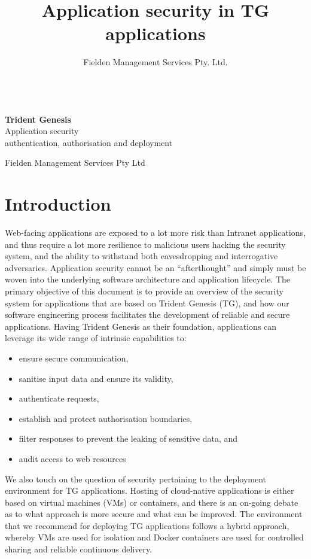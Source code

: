 \documentclass[a4paper,12pt,oneside,openright]{memoir}
\title{Application security in TG applications}
\author{Fielden Management Services Pty. Ltd.}
\date{}
\newcommand*{\titleTH}{\begingroup%
\raggedleft
\vspace*{\baselineskip}
{\Large ~}\\[0.167\textheight]
{\bfseries Trident Genesis}\\[\baselineskip]
{\textcolor{basiccolor}{\Huge Application security}}\\[\baselineskip]
{\small authentication, authorisation and deployment}\par
\vfill
{\Large Fielden Management Services Pty Ltd}\par
\endgroup}
\begin{document}
\titleTH
\thispagestyle{empty}
\clearpage
{}


\onehalfspacing

\section*{Introduction}\label{sec:00}
	Web-facing applications are exposed to a lot more risk than Intranet applications, and thus require a lot more resilience to malicious users hacking the security system, and the ability to withstand both eavesdropping and interrogative adversaries.
	Application security cannot be an ``afterthought'' and simply must be woven into the underlying software architecture and application lifecycle.
	The primary objective of this document is to provide an overview of the security system for applications that are based on Trident Genesis (TG), and how our software engineering process facilitates the development of reliable and secure applications.
	Having Trident Genesis as their foundation, applications can leverage its wide range of intrinsic capabilities to:

	\begin{itemize}
	\item ensure secure communication,
	\item sanitise input data and ensure its validity,
	\item authenticate requests,
	\item establish and protect authorisation boundaries,
	\item filter responses to prevent the leaking of sensitive data, and
	\item audit access to web resources
	\end{itemize}

	We also touch on the question of security pertaining to the deployment environment for TG applications.
    Hosting of cloud-native applications is either based on virtual machines (VMs) or containers, and there is an on-going debate as to what approach is more secure and what can be improved.
	The environment that we recommend for deploying TG applications follows a hybrid approach, whereby VMs are used for isolation and Docker containers are used for controlled sharing and reliable continuous delivery.
\end{document}
